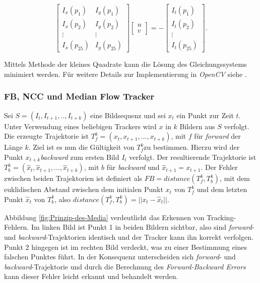 \begin{enumerate}
	\begin{equation}
	\left[\begin{array}{cc}
	I_{x}(p_{1}) & I_{y}(p_{1})\\
	I_{x}(p_{2}) & I_{y}(p_{2})\\
	\vdots & \vdots\\
	I_{x}(p_{25}) & I_{y}(p_{25})
	\end{array}\right]\left[\begin{array}{c}
	u\\
	v
	\end{array}\right]=-\left[\begin{array}{c}
	I_{t}(p_{1})\\
	I_{t}(p_{2})\\
	\vdots\\
	I_{t}(p_{25})
	\end{array}\right].
	\end{equation}
	\end{enumerate}
	Mittels Methode der kleines Quadrate kann die Lösung des Gleichungssystems minimiert werden. Für weitere Details zur Implementierung in \textit{OpenCV}
	siehe \cite{OCV}.
	
	\subsubsection{FB, NCC und Median Flow Tracker}
	Sei $S=(I_{t},I_{t+1},..,I_{t+k})$ eine Bildsequenz und sei $x_{t}$ ein Punkt zur Zeit $t$. Unter Verwendung eines beliebigen Trackers wird $x$ in $k$ Bildern aus $S$ verfolgt. Die erzeugte Trajektorie ist $T_{f}^{k}=(x_{t},x_{t+1},...,x_{t+k})$, mit $f$ für \textit{forward} der Länge $k$. Ziel ist es nun die Gültigkeit von $T_{f}^{k}$zu bestimmen. Hierzu wird der Punkt $x_{t+k}$\textit{backward} zum ersten Bild $I_{t}$ verfolgt. Der resultierende Trajektorie ist $T_{b}^{k}=(\hat{x}_{t},\hat{x}_{t+1},...,\hat{x}_{t+k})$, mit $b$ für \textit{backward} und $\hat{x}_{t+1}=x_{t+1}$. Der Fehler zwischen beiden Trajektorien ist definiert als $FB=distance(T_{f}^{k},T_{b}^{k})$, mit dem euklidischen Abstand zwischen dem initialen Punkt $x_{t}$ von $T_{f}^{k}$ und dem letzten Punkt $\hat{x}_{t}$ von $T_{b}^{k}$, also $distance(T_{f}^{k},T_{b}^{k})=||x_{t}-\hat{x}_{t}||$.

	Abbildung \ref{fig:Prinzip-des-Media} verdeutlicht das Erkennen von Tracking-Fehlern. Im linken Bild ist Punkt 1 in beiden Bildern sichtbar, also sind \textit{forward}- und \textit{backward}-Trajektorien identisch und der Tracker kann ihn korrekt verfolgen. Punkt 2 hingegen ist im rechten Bild verdeckt, was zu einer Bestimmung eines falschen Punktes führt. In der Konsequenz unterscheiden sich \textit{forward}- und \textit{backward}-Trajektorie und durch die Berechnung des \textit{Forward-Backward Errors} kann dieser Fehler leicht erkannt und behandelt werden.

